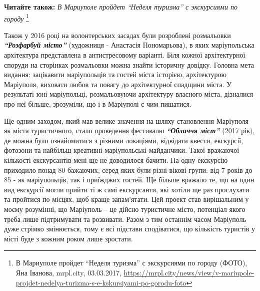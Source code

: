 
\textbf{Читайте також:} \emph{В Мариуполе пройдет \enquote{Неделя туризма} с экскурсиями по городу}%
\footnote{В Мариуполе пройдет \enquote{Неделя туризма} с экскурсиями по городу (ФОТО), Яна Іванова, mrpl.city, 03.03.2017, \url{https://mrpl.city/news/view/v-mariupole-projdet-nedelya-turizma-s-e-kskursiyami-po-gorodu-foto}}


Також у 2016 році на волонтерських засадах були розроблені розмальовки
\emph{\textbf{\enquote{Розфарбуй місто}}} (художниця - Анастасія Пономарьова), в яких маріупольська
архітектура представлена в антистресовому варіанті. Біля кожної архітектурної
споруди на сторінках розмальовки можна знайти історичну довідку. Головна мета
видання: зацікавити маріупольців та гостей міста історією, архітектурою
Маріуполя, виховати любов та повагу до архітектурної спадщини міста. У
результаті юні маріупольці, розмальовуючи архітектуру власного міста, дізналися
про неї більше, зрозуміли, що і в Маріуполі є чим пишатися.


Ще одним заходом, який мав велике значення на шляху становлення Маріуполя як
міста туристичного, стало проведення фестивалю \textbf{\emph{\enquote{Обличчя міст}}} (2017 рік), де
можна було ознайомитися з різними локаціями, відвідати квести, екскурсії,
фотозони та найбільш креативні маріупольські майданчики. Такої вражаючої
кількості екскурсантів мені ще не доводилося бачити. На одну екскурсію
приходило понад 80 бажаючих, серед яких були різні вікові групи: від 7 років до
85 - як маріупольців, так і приїжджих гостей. Ще більше вражало те, що на один
вид екскурсії могли прийти ті ж самі екскурсанти, які хотіли ще раз прослухати
та пройтися по місцях, щоб краще запам'ятати. Цей проект став вирішальним у
моєму розумінні, що Маріуполь – це дійсно туристичне місто, потенціал якого
треба лише підтримувати та розвивати. Разом з тим останнім часом Маріуполь дуже
стрімко змінюється, тому є всі підстави сподіватися, що кількість туристів у
місті буде з кожним роком лише зростати.

